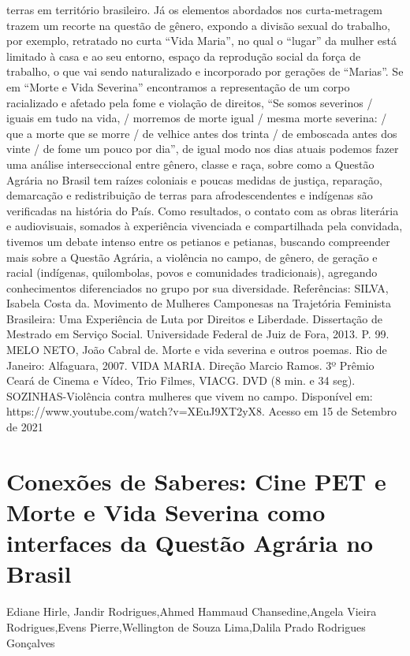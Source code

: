 terras em território brasileiro. Já os elementos abordados nos curta-metragem trazem um recorte 
na questão de gênero, expondo a divisão sexual do trabalho, por exemplo, retratado no curta “Vida 
Maria”, no qual o “lugar” da mulher está limitado à casa e ao seu entorno, espaço da reprodução 
social da força de trabalho, o que vai sendo naturalizado e incorporado por gerações de “Marias”.
Se em “Morte e Vida Severina” encontramos a representação de um corpo racializado e 
afetado pela fome e violação de direitos, “Se somos severinos / iguais em tudo na vida, / morremos 
de morte igual / mesma morte severina: / que a morte que se morre / de velhice antes dos trinta / 
de emboscada antes dos vinte / de fome um pouco por dia”, de igual modo nos dias atuais podemos 
fazer uma análise interseccional entre gênero, classe e raça, sobre como a Questão Agrária no 
Brasil tem raízes coloniais e poucas medidas de justiça, reparação, demarcação e redistribuição de 
terras para afrodescendentes e indígenas são verificadas na história do País.
Como resultados, o contato com as obras literária e audiovisuais, somados à experiência 
vivenciada e compartilhada pela convidada, tivemos um debate intenso entre os petianos e 
petianas, buscando compreender mais sobre a Questão Agrária, a violência no campo, de gênero, 
de geração e racial (indígenas, quilombolas, povos e comunidades tradicionais), agregando 
conhecimentos diferenciados no grupo por sua diversidade. 
Referências:
SILVA, Isabela Costa da. Movimento de Mulheres Camponesas na Trajetória Feminista 
Brasileira: Uma Experiência de Luta por Direitos e Liberdade. Dissertação de Mestrado em 
Serviço Social. Universidade Federal de Juiz de Fora, 2013. P. 99.
MELO NETO, João Cabral de. Morte e vida severina e outros poemas. Rio de Janeiro: Alfaguara, 
2007.
VIDA MARIA. Direção Marcio Ramos. 3º Prêmio Ceará de Cinema e Vídeo, Trio Filmes, 
VIACG. DVD (8 min. e 34 seg).
SOZINHAS-Violência contra mulheres que vivem no campo. Disponível em: 
https://www.youtube.com/watch?v=XEuJ9XT2yX8. Acesso em 15 de Setembro de 2021



\section{Conexões de Saberes: Cine PET e Morte e Vida Severina como interfaces da Questão Agrária no Brasil}

Ediane Hirle, Jandir Rodrigues,Ahmed Hammaud Chansedine,Angela Vieira Rodrigues,Evens Pierre,Wellington de Souza Lima,Dalila Prado Rodrigues Gonçalves

